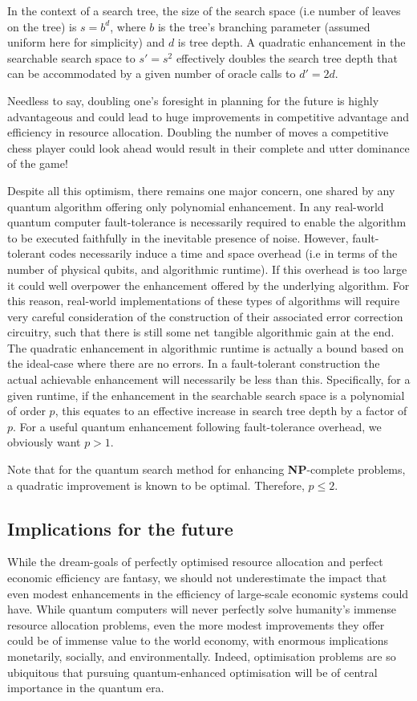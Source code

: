 In the context of a search tree, the size of the search space (i.e number of leaves on the tree) is \mbox{$s=b^d$},
where $b$ is the tree's branching parameter (assumed uniform here for simplicity) and $d$ is tree depth. A quadratic enhancement in the searchable search space to \mbox{$s'=s^2$} effectively doubles the search tree depth that can be accommodated by a given number of oracle calls to \mbox{$d'=2d$}.

Needless to say, doubling one's foresight in planning for the future is highly advantageous and could lead to huge improvements in competitive advantage and efficiency in resource allocation. Doubling the number of moves a competitive chess player could look ahead would result in their complete and utter dominance of the game!

Despite all this optimism, there remains one major concern, one shared by any quantum algorithm offering only polynomial enhancement. In any real-world quantum computer fault-tolerance is necessarily required to enable the algorithm to be executed faithfully in the inevitable presence of noise. However, fault-tolerant codes necessarily induce a time and space overhead (i.e in terms of the number of physical qubits, and algorithmic runtime). If this overhead is too large it could well overpower the   enhancement offered by the underlying algorithm. For this reason, real-world implementations of these types of algorithms will require very careful consideration of the construction of their associated error correction circuitry, such that there is still some net tangible algorithmic gain at the end. The quadratic enhancement in algorithmic runtime is actually a bound based on the ideal-case where there are no errors. In a fault-tolerant construction the actual achievable enhancement will necessarily be less than this. Specifically, for a given runtime, if the enhancement in the searchable search space is a polynomial of order $p$, this equates to an effective increase in search tree depth by a factor of $p$. For a useful quantum enhancement following fault-tolerance overhead, we obviously want \mbox{$p>1$}.

Note that for the quantum search method for enhancing \textbf{NP}-complete problems, a quadratic improvement is known to be optimal. Therefore, \mbox{$p\leq 2$}.

\subsection{Implications for the future}

While the dream-goals of perfectly optimised resource allocation and perfect economic efficiency are fantasy, we should not underestimate the impact that even modest enhancements in the efficiency of large-scale economic systems could have. While quantum computers will never perfectly solve humanity's immense resource allocation problems, even the more modest improvements they offer could be of immense value to the world economy, with enormous implications monetarily, socially, and environmentally. Indeed, optimisation problems are so ubiquitous that pursuing quantum-enhanced optimisation will be of central importance in the quantum era.